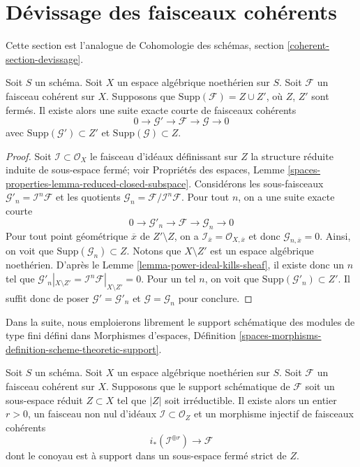 \section{Dévissage des faisceaux cohérents}
\label{section-devissage}

\noindent
Cette section est l'analogue de
Cohomologie des schémas, section \ref{coherent-section-devissage}.

\begin{lemma}
\label{lemma-prepare-filter-support}
Soit $S$ un schéma. Soit $X$ un espace algébrique noethérien sur $S$.
Soit $\mathcal{F}$ un faisceau cohérent sur $X$. Supposons que
$\text{Supp}(\mathcal{F}) = Z \cup Z'$, où $Z$, $Z'$ sont fermés.
Il existe alors une suite exacte courte de faisceaux cohérents
$$
0 \to \mathcal{G}' \to \mathcal{F} \to \mathcal{G} \to 0
$$
avec $\text{Supp}(\mathcal{G}') \subset Z'$ et
$\text{Supp}(\mathcal{G}) \subset Z$.
\end{lemma}

\begin{proof}
Soit $\mathcal{I} \subset \mathcal{O}_X$ le faisceau d'idéaux
définissant sur $Z$ la structure réduite induite de sous-espace fermé; voir
Propriétés des espaces, Lemme
\ref{spaces-properties-lemma-reduced-closed-subspace}.
Considérons les sous-faisceaux
$\mathcal{G}'_n = \mathcal{I}^n\mathcal{F}$ et les
quotients $\mathcal{G}_n = \mathcal{F}/\mathcal{I}^n\mathcal{F}$.
Pour tout $n$, on a une suite exacte courte
$$
0 \to \mathcal{G}'_n \to \mathcal{F} \to \mathcal{G}_n \to 0
$$
Pour tout point géométrique $\overline{x}$ de $Z' \setminus Z$, on a
$\mathcal{I}_{\overline{x}} = \mathcal{O}_{X, \overline{x}}$
et donc $\mathcal{G}_{n, \overline{x}} = 0$. Ainsi, on voit que
$\text{Supp}(\mathcal{G}_n) \subset Z$. Notons que $X \setminus Z'$
est un espace algébrique noethérien. D'après le
Lemme \ref{lemma-power-ideal-kills-sheaf},
il existe donc un $n$ tel que $\mathcal{G}'_n|_{X \setminus Z'} =
\mathcal{I}^n\mathcal{F}|_{X \setminus Z'} = 0$.
Pour un tel $n$, on voit que $\text{Supp}(\mathcal{G}'_n) \subset Z'$.
Il suffit donc de poser $\mathcal{G}' = \mathcal{G}'_n$ et $\mathcal{G} = \mathcal{G}_n$
pour conclure.
\end{proof}

\noindent
Dans la suite, nous emploierons librement le support schématique des
modules de type fini défini dans Morphismes d'espaces, Définition
\ref{spaces-morphisms-definition-scheme-theoretic-support}.

\begin{lemma}
\label{lemma-prepare-filter-irreducible}
Soit $S$ un schéma. Soit $X$ un espace algébrique noethérien sur $S$.
Soit $\mathcal{F}$ un faisceau cohérent sur $X$. Supposons que le support
schématique de $\mathcal{F}$ soit un sous-espace réduit $Z \subset X$ tel que
$|Z|$ soit irréductible. Il existe alors un entier $r > 0$, un
faisceau non nul d'idéaux $\mathcal{I} \subset \mathcal{O}_Z$ et un
morphisme injectif de faisceaux cohérents
$$
i_*\left(\mathcal{I}^{\oplus r}\right) \to \mathcal{F}
$$
dont le conoyau est à support dans un sous-espace fermé strict de $Z$.
\end{lemma}

